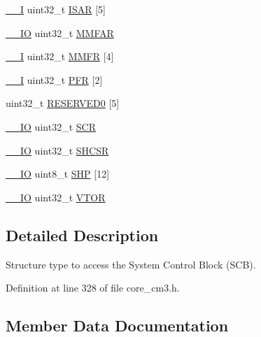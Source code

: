 \begin{DoxyCompactItemize}
\hyperlink{core__cm3_8h_af63697ed9952cc71e1225efe205f6cd3}{\+\_\+\+\_\+I} uint32\+\_\+t \hyperlink{structSCB__Type_acee8e458f054aac964268f4fe647ea4f}{I\+S\+AR} \mbox{[}5\mbox{]}
\item 
\hyperlink{core__cm3_8h_aec43007d9998a0a0e01faede4133d6be}{\+\_\+\+\_\+\+IO} uint32\+\_\+t \hyperlink{structSCB__Type_ac49b24b3f222508464f111772f2c44dd}{M\+M\+F\+AR}
\item 
\hyperlink{core__cm3_8h_af63697ed9952cc71e1225efe205f6cd3}{\+\_\+\+\_\+I} uint32\+\_\+t \hyperlink{structSCB__Type_aec2f8283d2737c6897188568a4214976}{M\+M\+FR} \mbox{[}4\mbox{]}
\item 
\hyperlink{core__cm3_8h_af63697ed9952cc71e1225efe205f6cd3}{\+\_\+\+\_\+I} uint32\+\_\+t \hyperlink{structSCB__Type_a3f51c43f952f3799951d0c54e76b0cb7}{P\+FR} \mbox{[}2\mbox{]}
\item 
uint32\+\_\+t \hyperlink{structSCB__Type_ac89a5d9901e3748d22a7090bfca2bee6}{R\+E\+S\+E\+R\+V\+E\+D0} \mbox{[}5\mbox{]}
\item 
\hyperlink{core__cm3_8h_aec43007d9998a0a0e01faede4133d6be}{\+\_\+\+\_\+\+IO} uint32\+\_\+t \hyperlink{structSCB__Type_abfad14e7b4534d73d329819625d77a16}{S\+CR}
\item 
\hyperlink{core__cm3_8h_aec43007d9998a0a0e01faede4133d6be}{\+\_\+\+\_\+\+IO} uint32\+\_\+t \hyperlink{structSCB__Type_ae9891a59abbe51b0b2067ca507ca212f}{S\+H\+C\+SR}
\item 
\hyperlink{core__cm3_8h_aec43007d9998a0a0e01faede4133d6be}{\+\_\+\+\_\+\+IO} uint8\+\_\+t \hyperlink{structSCB__Type_af6336103f8be0cab29de51daed5a65f4}{S\+HP} \mbox{[}12\mbox{]}
\item 
\hyperlink{core__cm3_8h_aec43007d9998a0a0e01faede4133d6be}{\+\_\+\+\_\+\+IO} uint32\+\_\+t \hyperlink{structSCB__Type_a0faf96f964931cadfb71cfa54e051f6f}{V\+T\+OR}
\end{DoxyCompactItemize}


\subsection{Detailed Description}
Structure type to access the System Control Block (S\+CB). 

Definition at line 328 of file core\+\_\+cm3.\+h.



\subsection{Member Data Documentation}
